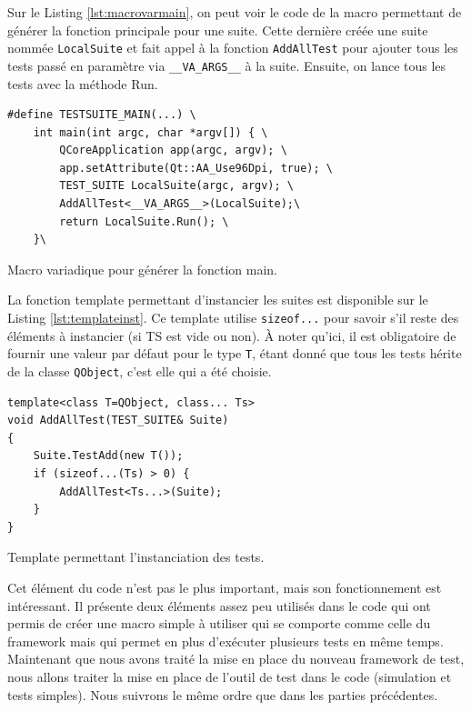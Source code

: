 \documentclass[a4paper]{article}
\begin{document}
Sur le Listing \ref{lst:macrovarmain}, on peut voir le code de la macro
permettant de générer la fonction principale pour une suite. Cette dernière
créée une suite nommée \verb|LocalSuite| et fait appel à la fonction
\verb|AddAllTest| pour ajouter tous les tests passé en paramètre via
\verb|__VA_ARGS__| à la suite. Ensuite, on lance tous les tests avec la méthode
Run.

\pagebreak
\begin{listing}[ht!]
\begin{verbatim}
#define TESTSUITE_MAIN(...) \
    int main(int argc, char *argv[]) { \
        QCoreApplication app(argc, argv); \
        app.setAttribute(Qt::AA_Use96Dpi, true); \
        TEST_SUITE LocalSuite(argc, argv); \
        AddAllTest<__VA_ARGS__>(LocalSuite);\
        return LocalSuite.Run(); \
    }\
\end{verbatim}
\caption{Macro variadique pour générer la fonction main.}
\label{lst:macrovarmain}
\end{listing}

La fonction template permettant d'instancier les suites est disponible sur le
Listing \ref{lst:templateinst}. Ce template utilise \verb|sizeof...| pour savoir
s'il reste des éléments à instancier (si TS est vide ou non). À noter qu'ici, il
est obligatoire de fournir une valeur par défaut pour le type \verb|T|, étant
donné que tous les tests hérite de la classe \verb|QObject|, c'est elle qui a
été choisie.

\begin{listing}[ht!]
\begin{verbatim}
template<class T=QObject, class... Ts>
void AddAllTest(TEST_SUITE& Suite)
{
    Suite.TestAdd(new T());
    if (sizeof...(Ts) > 0) {
        AddAllTest<Ts...>(Suite);
    }
}
\end{verbatim}
\caption{Template permettant l'instanciation des tests.}
\label{lst:templateinst}
\end{listing}

Cet élément du code n'est pas le plus important, mais son fonctionnement est
intéressant. Il présente deux éléments assez peu utilisés dans le code qui ont
permis de créer une macro simple à utiliser qui se comporte comme celle du
framework mais qui permet en plus d'exécuter plusieurs tests en même temps. \\

Maintenant que nous avons traité la mise en place du nouveau framework de test,
nous allons traiter la mise en place de l'outil de test dans le code (simulation
et tests simples). Nous suivrons le même ordre que dans les parties précédentes.
\end{document}
